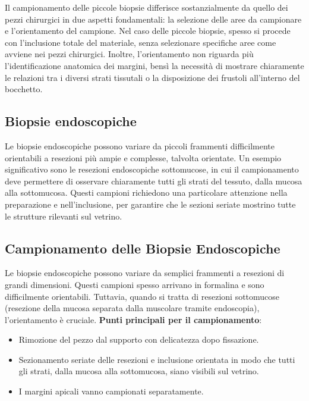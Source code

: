 Il campionamento delle piccole biopsie differisce sostanzialmente da quello dei pezzi chirurgici in due aspetti fondamentali: la selezione delle aree da campionare e l'orientamento del campione. Nel caso delle piccole biopsie, spesso si procede con l'inclusione totale del materiale, senza selezionare specifiche aree come avviene nei pezzi chirurgici. Inoltre, l'orientamento non riguarda più l'identificazione anatomica dei margini, bensì la necessità di mostrare chiaramente le relazioni tra i diversi strati tissutali o la disposizione dei frustoli all'interno del bocchetto.

\subsection{Biopsie endoscopiche}

Le biopsie endoscopiche possono variare da piccoli frammenti difficilmente orientabili a resezioni più ampie e complesse, talvolta orientate. Un esempio significativo sono le resezioni endoscopiche sottomucose, in cui il campionamento deve permettere di osservare chiaramente tutti gli strati del tessuto, dalla mucosa alla sottomucosa. Questi campioni richiedono una particolare attenzione nella preparazione e nell'inclusione, per garantire che le sezioni seriate mostrino tutte le strutture rilevanti sul vetrino.

\subsection{Campionamento delle Biopsie Endoscopiche}
Le biopsie endoscopiche possono variare da semplici frammenti a resezioni di grandi dimensioni. Questi campioni spesso arrivano in formalina e sono difficilmente orientabili. Tuttavia, quando si tratta di resezioni sottomucose (resezione della mucosa separata dalla muscolare tramite endoscopia), l'orientamento è cruciale. 
\textbf{Punti principali per il campionamento}:
\begin{itemize}
    \item Rimozione del pezzo dal supporto con delicatezza dopo fissazione.
    \item Sezionamento seriate delle resezioni e inclusione orientata in modo che tutti gli strati, dalla mucosa alla sottomucosa, siano visibili sul vetrino.
    \item I margini apicali vanno campionati separatamente.
\end{itemize}


